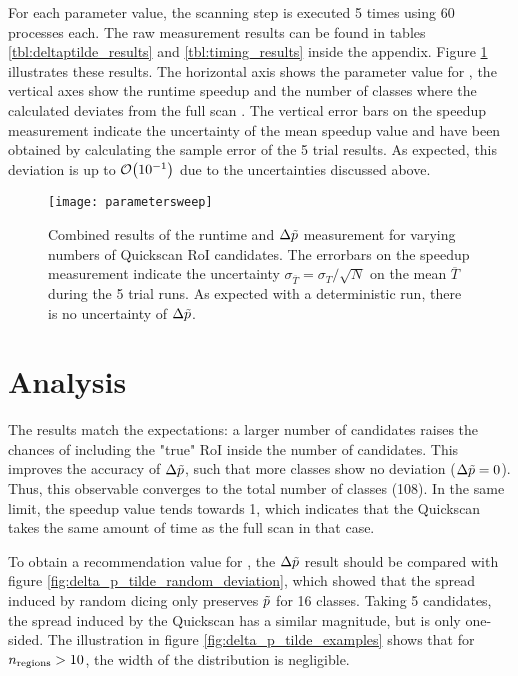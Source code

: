 For each parameter value, the scanning step is executed 5 times using 60 processes each. The raw measurement results can be found in tables \ref{tbl:deltaptilde_results} and \ref{tbl:timing_results} inside the appendix. Figure \ref{fig:parametersweep} illustrates these results. The horizontal axis shows the parameter value for \paramregions, the vertical axes show the runtime speedup and the number of classes where the calculated \ptilde deviates from the full scan \ptilde. The vertical error bars on the speedup measurement indicate the uncertainty of the mean speedup value and have been obtained by calculating the sample error of the 5 trial results. As expected, this deviation is up to $\order{10^{-1}}$ due to the uncertainties discussed above.

\begin{figure}[htbp]
	\centering
	\texttt{[image: parametersweep]}
	\caption{Combined results of the runtime and $\Delta \tilde{p}$ measurement for varying numbers of Quickscan RoI candidates. The errorbars on the speedup measurement indicate the uncertainty $\sigma_{\overline T} = \sigma_T / \sqrt{N}$ on the mean $\overline T$ during the 5 trial runs. As expected with a deterministic run, there is no uncertainty of $\Delta \tilde{p}$.}
	\label{fig:parametersweep}
\end{figure}

\section{Analysis}
The results match the expectations: a larger number of candidates raises the chances of including the "true" RoI inside the number of candidates. This improves the accuracy of $\Delta \tilde{p}$, such that more classes show no deviation ($\Delta \tilde{p} = 0$). Thus, this observable converges to the total number of classes (108). In the same limit, the speedup value tends towards 1, which indicates that the Quickscan takes the same amount of time as the full scan in that case.

To obtain a recommendation value for \paramregions, the $\Delta \tilde{p}$ result should be compared with figure \ref{fig:delta_p_tilde_random_deviation}, which showed that the spread induced by random dicing only preserves $\tilde{p}$ for 16 classes. Taking 5 candidates, the spread induced by the Quickscan has a similar magnitude, but is only one-sided.
The illustration in figure \ref{fig:delta_p_tilde_examples} shows that for ${n_\mathrm{regions}} > 10$, the width of the distribution is negligible. 

